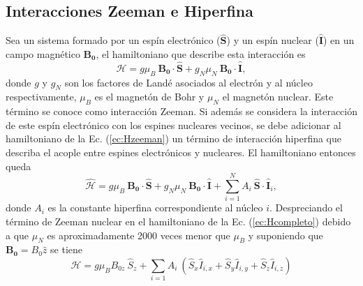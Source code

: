 \documentclass[aps,prl,reprint,superscriptaddress,showkeys]{revtex4-2}
\begin{document}
\subsection{Interacciones Zeeman e Hiperfina \label{sec:interacciones}}
Sea un sistema formado por un espín electrónico ($\mathbf{\hat{S}}$) y un espín nuclear ($\mathbf{\hat{I}}$) en un campo magnético $\mathbf{B_0}$, el hamiltoniano que describe esta interacción es \cite{weil_electron_2007}
\begin{equation}
    \mathcal{H} = g \mu_B ~ \mathbf{B_0} \cdot \mathbf{\hat{S}} + g_N \mu_N ~\mathbf{B_0} \cdot \mathbf{\hat{I}},
    \label{ec:Hzeeman}
\end{equation}
donde $g$ y $g_N$ son los factores de Landé asociados al electrón y al núcleo respectivamente, $\mu_B$ es el magnetón de Bohr y $\mu_N$ el magnetón nuclear. Este término se conoce como interacción Zeeman. Si además se considera la interacción de este espín electrónico con los espines nucleares vecinos, se debe adicionar al hamiltoniano de la Ec. (\ref*{ec:Hzeeman}) un término de interacción hiperfina que describa el acople entre espines electrónicos y nucleares. El hamiltoniano entonces queda
\begin{equation}
    \mathcal{\hat{H}} = g \mu_B ~\mathbf{B_0} \cdot \mathbf{\hat{S}} + g_N \mu_N ~\mathbf{B_0} \cdot \mathbf{\hat{I}} + \sum_{i=1}^{N} A_i~ \mathbf{\hat{S}} \cdot \mathbf{\hat{I}}_i,
    \label{ec:Hcompleto}
\end{equation}
donde $A_i$ es la constante hiperfina correspondiente al núcleo $i$. Despreciando el término de Zeeman nuclear en el hamiltoniano de la Ec. (\ref*{ec:Hcompleto}) debido a que $\mu_N$ es aproximadamente 2000 veces menor que $\mu_B$ y suponiendo que $\mathbf{B_0} = B_0 \hat{z}$ se tiene
\begin{equation}
    \mathcal{H} = g \mu_B B_{0z} ~\hat{S}_z + \sum_{i=1} A_i~ (\hat{S}_x \hat{I}_{i,x} + \hat{S}_y \hat{I}_{i,y} + \hat{S}_z \hat{I}_{i,z})  
\end{equation}
\end{document}
